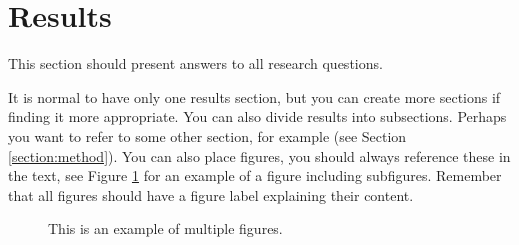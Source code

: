 \section{Results}
\label{section:results}
This section should present answers to all research questions.

It is normal to have only one results section, but you can create more sections if finding it more appropriate. You can also divide results into subsections. Perhaps you want to refer to some other section, for example (see Section \ref{section:method}). You can also place figures, you should always reference these in the text, see Figure \ref{fig:MDHlogga} for an example of a figure including subfigures. Remember that all figures should have a figure label explaining their content.


\begin{figure}[H]
    \centering
    \qquad
    \qquad
    \caption[Short text]{This is an example of multiple figures.}
    \label{fig:MDHlogga}
\end{figure}